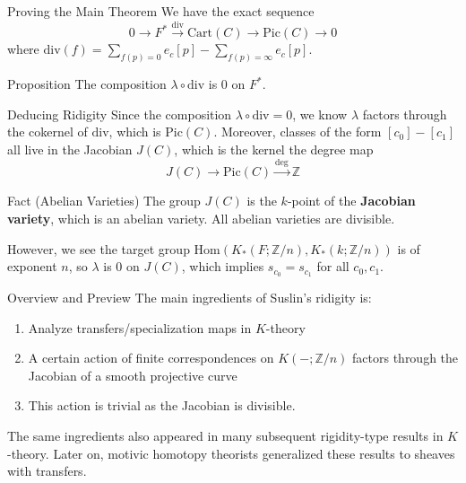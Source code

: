 \documentclass{beamer}
\begin{document}
\begin{frame}{Proving the Main Theorem}
We have the exact sequence 
\[0\xrightarrow{}F^*\xrightarrow{\textrm{div}}\textrm{Cart}(C)\xrightarrow{} \textrm{Pic}(C)\xrightarrow{}0\]
where $\textrm{div}(f)= \sum_{f(p)=0}e_c[p]-\sum_{f(p)=\infty}e_c[p]$.

\begin{block}{Proposition}
The composition $\lambda\circ \textrm{div}$ is $0$ on $F^*$.  
\end{block}
\vfill
\vfill




\end{frame}

\begin{frame}{Deducing Ridigity}
Since the composition $\lambda\circ \textrm{div}=0$, we know $\lambda$ factors through the cokernel of $\textrm{div}$, which is $\textrm{Pic}(C)$. Moreover, classes of the form $[c_0]-[c_1]$ all live in the Jacobian $J(C)$, which is the kernel the degree map 
\[J(C)\xrightarrow{} \textrm{Pic}(C)\xrightarrow{\textrm{deg}} \mathbb{Z}\]

\pause

\begin{block}{Fact  (Abelian Varieties)}
The group $J(C)$ is the $k$-point of the \textbf{Jacobian variety}, which is an abelian variety. All abelian varieties are divisible.
\end{block}
However, we see the target group $\textrm{Hom}(K_*(F; \mathbb{Z}/n), K_*(k; \mathbb{Z}/n))$ is of exponent $n$, so $\lambda$ is $0$ on $J(C)$, which implies $s_{c_0}=s_{c_1}$ for all $c_0,c_1$.

\end{frame}

\begin{frame}{Overview and Preview}
 The main ingredients of Suslin's ridigity is: 
 \begin{enumerate}
  \item  Analyze transfers/specialization maps in $K$-theory \pause
  \item A certain action of finite correspondences on $K(-; \mathbb{Z}/n)$ factors through the Jacobian of a smooth projective curve \pause
  \item This action is trivial as the Jacobian is divisible. \pause
 \end{enumerate}
 \vfill
The same ingredients also appeared in many subsequent rigidity-type results in $K$-theory. Later on, motivic homotopy theorists generalized these results to sheaves with transfers.

\end{frame}
\end{document}
